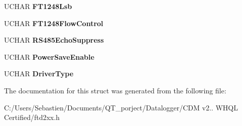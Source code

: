 \begin{DoxyCompactItemize}
U\+C\+H\+AR {\bfseries F\+T1248\+Lsb}
\item 
\mbox{\label{structft__eeprom__x__series_a41a97bfe47b52d3143f6e6a3c833da03}} 
U\+C\+H\+AR {\bfseries F\+T1248\+Flow\+Control}
\item 
\mbox{\label{structft__eeprom__x__series_a1c3a9dc30091091132b7ec653676f589}} 
U\+C\+H\+AR {\bfseries R\+S485\+Echo\+Suppress}
\item 
\mbox{\label{structft__eeprom__x__series_adb0618ee1305d47abec850be8f315ed4}} 
U\+C\+H\+AR {\bfseries Power\+Save\+Enable}
\item 
\mbox{\label{structft__eeprom__x__series_a9379ff3b9473a839ebd27a753c3c1b60}} 
U\+C\+H\+AR {\bfseries Driver\+Type}
\end{DoxyCompactItemize}


The documentation for this struct was generated from the following file\+:\begin{DoxyCompactItemize}
\item 
C\+:/\+Users/\+Sebastien/\+Documents/\+Q\+T\+\_\+porject/\+Datalogger/\+C\+D\+M v2.. W\+H\+Q\+L Certified/ftd2xx.\+h\end{DoxyCompactItemize}
